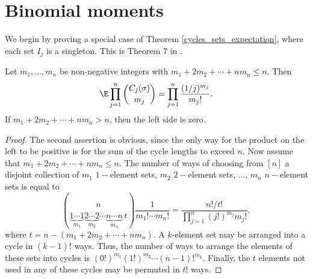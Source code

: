 \section{Binomial moments}\label{sec:binom}
%
%
%

We begin by proving a special case of Theorem \ref{cycles_sets_expectation},
where each set $I_j$ is a singleton.  This is Theorem 7 in \cite{watterson}.

\begin{lem}\label{cycles}
Let $m_1,\ldots,m_n$ be non-negative integers with $m_1+2m_2+\cdots+nm_n\le n$.  Then
 \[
\E \prod_{j=1}^n \binom{C_j(\sigma)}{m_j} = \prod_{j=1}^n \frac{(1/j)^{m_j}}{m_j!}.
\]
If  $m_1+2m_2+\cdots+nm_n > n$, then the left side is zero.
\end{lem}
\begin{proof}
The second assertion is obvious, since the only way for the product on the left to be positive is for the sum of the cycle lengths to exceed $n$. Now assume that
$m_1+2m_2+\cdots+nm_n\le n$. 
 The number of ways of choosing from $[n]$ a disjoint collection 
  of $m_1$ $1-$element sets, $m_2$  $2-$element sets,
$\ldots$, $m_n$ $n-$element sets is equal to
\[
 \binom{n}{\underbrace{1 \cdots 1}_{m_1} \underbrace{2 \cdots 2}_{m_2} \cdots \underbrace{n\cdots n}_{m_n} \, t} 
 \frac{1}{m_1! \cdots m_n!} = \frac{n!/t!}{\prod_{j=1}^n (j!)^{m_j} m_j!},
 \]
where $t=n-(m_1+2m_2+\cdots+nm_n)$.
A $k$-element set may be arranged into a cycle in $(k-1)!$ ways.
Thus, 
the number of ways to arrange the elements of these sets into cycles is $(0!)^{m_1} (1!)^{m_2} \cdots (n-1)!^{m_k}$.
Finally, the $t$ elements not used in any of these cycles may be permuted in $t!$ ways.
\end{proof}
